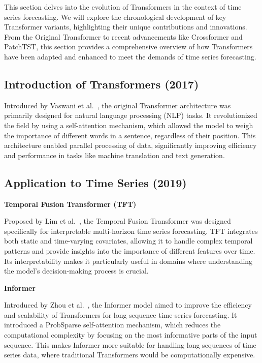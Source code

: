 This section delves into the evolution of Transformers in the context of time series forecasting. We will explore the chronological development of key Transformer variants, highlighting their unique contributions and innovations. From the Original Transformer to recent advancements like Crossformer and PatchTST, this section provides a comprehensive overview of how Transformers have been adapted and enhanced to meet the demands of time series forecasting.

\subsection{Introduction of Transformers (2017)}

Introduced by Vaswani et al.~\cite{vaswani2023attention}, the original Transformer architecture was primarily designed for natural language processing (NLP) tasks. It revolutionized the field by using a self-attention mechanism, which allowed the model to weigh the importance of different words in a sentence, regardless of their position. This architecture enabled parallel processing of data, significantly improving efficiency and performance in tasks like machine translation and text generation.
\vspace{10pt}


\subsection{Application to Time Series (2019)}
\noindent\textbf
{Temporal Fusion Transformer (TFT)}

\noindent Proposed by Lim et al.~\cite{lim2020temporalfusiontransformersinterpretable}, the Temporal Fusion Transformer was designed specifically for interpretable multi-horizon time series forecasting. TFT integrates both static and time-varying covariates, allowing it to handle complex temporal patterns and provide insights into the importance of different features over time. Its interpretability makes it particularly useful in domains where understanding the model’s decision-making process is crucial.
\vspace{10pt}


\noindent\textbf
{Informer}

\noindent Introduced by Zhou et al.~\cite{zhou2021informerefficienttransformerlong}, the Informer model aimed to improve the efficiency and scalability of Transformers for long sequence time-series forecasting. It introduced a ProbSparse self-attention mechanism, which reduces the computational complexity by focusing on the most informative parts of the input sequence. This makes Informer more suitable for handling long sequences of time series data, where traditional Transformers would be computationally expensive.
\vspace{10pt}


